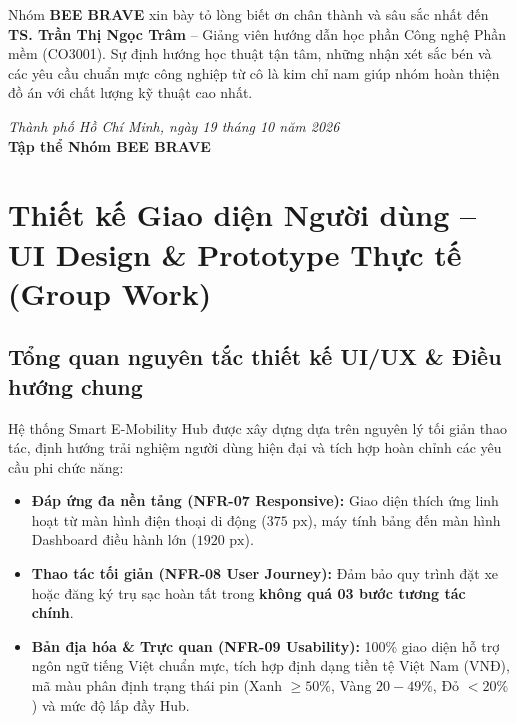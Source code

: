 \documentclass[12pt,a4paper]{article}
\begin{document}
Nhóm \textbf{BEE BRAVE} xin bày tỏ lòng biết ơn chân thành và sâu sắc nhất đến \textbf{TS. Trần Thị Ngọc Trâm} -- Giảng viên hướng dẫn học phần Công nghệ Phần mềm (CO3001). Sự định hướng học thuật tận tâm, những nhận xét sắc bén và các yêu cầu chuẩn mực công nghiệp từ cô là kim chỉ nam giúp nhóm hoàn thiện đồ án với chất lượng kỹ thuật cao nhất.

\begin{flushright}
    \textit{Thành phố Hồ Chí Minh, ngày 19 tháng 10 năm 2026}\\[0.1cm]
    \textbf{Tập thể Nhóm BEE BRAVE}
\end{flushright}
\newpage

\section{Thiết kế Giao diện Người dùng -- UI Design \& Prototype Thực tế (Group Work)}

\subsection{Tổng quan nguyên tắc thiết kế UI/UX \& Điều hướng chung}
Hệ thống Smart E-Mobility Hub được xây dựng dựa trên nguyên lý tối giản thao tác, định hướng trải nghiệm người dùng hiện đại và tích hợp hoàn chỉnh các yêu cầu phi chức năng:
\begin{itemize}[nosep]
    \item \textbf{Đáp ứng đa nền tảng (NFR-07 Responsive):} Giao diện thích ứng linh hoạt từ màn hình điện thoại di động ($375\text{ px}$), máy tính bảng đến màn hình Dashboard điều hành lớn ($1920\text{ px}$).
    \item \textbf{Thao tác tối giản (NFR-08 User Journey):} Đảm bảo quy trình đặt xe hoặc đăng ký trụ sạc hoàn tất trong \textbf{không quá 03 bước tương tác chính}.
    \item \textbf{Bản địa hóa \& Trực quan (NFR-09 Usability):} 100\% giao diện hỗ trợ ngôn ngữ tiếng Việt chuẩn mực, tích hợp định dạng tiền tệ Việt Nam (VNĐ), mã màu phân định trạng thái pin (Xanh $\ge 50\%$, Vàng $20-49\%$, Đỏ $<20\%$) và mức độ lấp đầy Hub.
\end{itemize}
\end{document}
